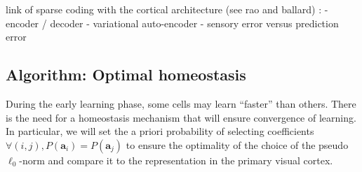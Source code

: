 \documentclass[a4paper, 11pt, draft]{article} %
\newcommand{\umin}[1]{\underset{#1}{\min}\;}
\newcommand{\norm}[1]{|\!| #1 |\!|}
\newcommand{\abs}[1]{\left|#1\right|}
\newcommand{\Xx}{\mathcal{X}}
\newcommand{\RR}{\mathbb{R}}
\newcommand{\coef}{\mathbf{a}} %
\begin{document}
%
%
%
%


link of sparse coding with the cortical architecture (see rao and ballard) : 
- encoder / decoder
- variational auto-encoder
- sensory error versus prediction error

\subsection{Algorithm: Optimal homeostasis}\label{HEH}


During the early learning phase, some cells may learn ``faster'' than others. There is the need for a homeostasis mechanism that will ensure convergence of learning. In particular, we will set the a priori probability of selecting coefficients {\color{BrickRed} $\forall (i,j), P(\coef_i)=P(\coef_j)$} to ensure the optimality of the choice of the  pseudo $\ell_0$-norm and compare it to the representation in the primary visual cortex.%




\end{document}
